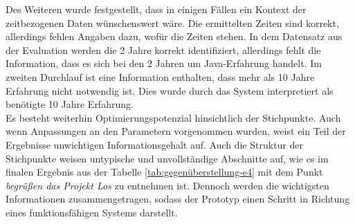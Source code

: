 Des Weiteren wurde festgestellt, dass in einigen Fällen ein Kontext der zeitbezogenen Daten wünschenswert wäre. Die ermittelten Zeiten sind korrekt, allerdings fehlen Angaben dazu, wofür die Zeiten stehen. In dem Datensatz aus der Evaluation werden die 2 Jahre korrekt identifiziert, allerdings fehlt die Information, dass es sich bei den 2 Jahren um Java-Erfahrung handelt. Im zweiten Durchlauf ist eine Information enthalten, dass mehr als 10 Jahre Erfahrung nicht notwendig ist. Dies wurde durch das System interpretiert als benötigte 10 Jahre Erfahrung.\\

Es besteht weiterhin Optimierungspotenzial hinsichtlich der Stichpunkte. Auch wenn Anpassungen an den Parametern vorgenommen wurden, weist ein Teil der Ergebnisse unwichtigen Informationsgehalt auf. Auch die Struktur der Stichpunkte weisen untypische und unvollständige Abschnitte auf, wie es im finalen Ergebnis aus der Tabelle \ref{tab:gegenüberstellung-e4} mit dem Punkt \emph{begrüßen das Projekt Los} zu entnehmen ist. Dennoch werden die wichtigsten Informationen zusammengetragen, sodass der Prototyp einen Schritt in Richtung eines funktionsfähigen Systems darstellt.
\newpage
